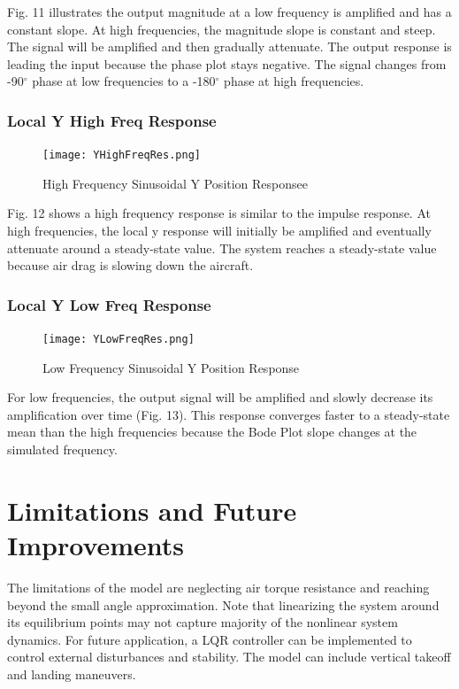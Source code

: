 \documentclass[conference]{IEEEtran}
\begin{document}
Fig. 11 illustrates the output magnitude at a low frequency is amplified and has a constant slope. At high frequencies, the magnitude slope is constant and steep. The signal will be amplified and then gradually attenuate. The output response is leading the input because the phase plot stays negative. The signal changes from -90$^{\circ}$ phase at low frequencies to a -180$^{\circ}$ phase at high frequencies.

\subsubsection{Local Y High Freq Response} 
\begin{figure}[htbp]
\centering
\centerline{\texttt{[image: YHighFreqRes.png]}}
\caption{High Frequency Sinusoidal Y  Position Responsee}
\label{figure}
\end{figure}

Fig. 12 shows a high frequency response is similar to the impulse response.  
At high frequencies, the local y response will initially be amplified and eventually attenuate around a steady-state value. The system reaches a steady-state value because air drag is slowing down the aircraft. \\

\newpage
\subsubsection{Local Y Low Freq Response} 
\begin{figure}[htbp]
\centerline{\texttt{[image: YLowFreqRes.png]}}
\caption{Low Frequency Sinusoidal Y Position Response}
\label{figure}
\end{figure}

For low frequencies, the output signal will be amplified and slowly decrease its amplification over time (Fig. 13).  This response converges faster to a steady-state mean than the high frequencies because the Bode Plot slope changes at the simulated frequency. \\


\section{Limitations and Future Improvements}
The limitations of the model are neglecting air torque resistance and reaching beyond the small angle approximation. Note that linearizing the system around its equilibrium points may not capture majority of the nonlinear system dynamics. For future application, a LQR controller can be implemented to control external disturbances and stability. The model can include vertical takeoff and landing maneuvers.
\end{document}
